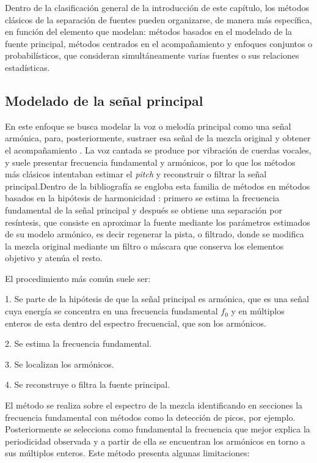 Dentro de la clasificación general de la introducción de este capítulo, los métodos clásicos de la separación de fuentes pueden organizarse, de manera más específica, en función del elemento que modelan: métodos basados en el modelado de la fuente principal, métodos centrados en el acompañamiento y enfoques conjuntos o probabilísticos, que consideran simultáneamente varias fuentes o sus relaciones estadísticas.
\subsection{Modelado de la señal principal}

En este enfoque se busca modelar la voz o melodía principal como una señal armónica, para, posteriormente, sustraer esa señal de la mezcla original y obtener el acompañamiento \cite{rafii18}. 
La voz cantada se produce por vibración de cuerdas vocales, y suele presentar frecuencia fundamental y armónicos, por lo que los métodos más clásicos intentaban estimar el \textit{pitch} y reconstruir o filtrar la señal principal.Dentro de la bibliografía se engloba esta familia de métodos en métodos basados en la hipótesis de harmonicidad \cite{rafii18}: primero se estima la frecuencia fundamental de la señal principal y después se obtiene una separación por resíntesis, que consiste en aproximar la fuente mediante los parámetros estimados de su modelo armónico, es decir regenerar la pista, o filtrado, donde se modifica la mezcla original mediante un filtro o máscara que conserva los elementos objetivo y atenúa el resto.

El procedimiento más común suele ser:

1. Se parte de la hipótesis de que la señal principal es armónica, que es una señal cuya energía se concentra en una frecuencia fundamental $f_{0}$ y en múltiplos enteros de esta dentro del espectro frecuencial, que son los armónicos.

2. Se estima la frecuencia fundamental.

3. Se localizan los armónicos.

4. Se reconstruye o filtra la fuente principal.

El método se realiza sobre el espectro de la mezcla identificando en secciones la frecuencia fundamental con métodos como la detección de picos, por ejemplo. Posteriormente se selecciona como fundamental la frecuencia que mejor explica la periodicidad observada y a partir de ella se encuentran los armónicos en torno a sus múltiplos enteros. Este método presenta algunas limitaciones:

